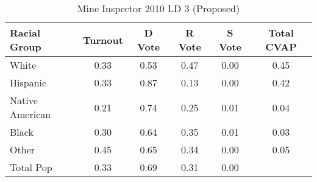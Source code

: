 \begin{table}[htb]
\begin{center}
\caption{Mine Inspector 2010 LD 3 (Proposed)}
\label{smine_cvap_ld_3}
\begin{tabular}{lccccc}
  \hline
Racial Group & Turnout & D Vote & R Vote & S Vote & Total CVAP \\ 
  \hline
White & 0.33 & 0.53 & 0.47 & 0.00 & 0.45 \\ 
  Hispanic & 0.33 & 0.87 & 0.13 & 0.00 & 0.42 \\ 
  Native American & 0.21 & 0.74 & 0.25 & 0.01 & 0.04 \\ 
  Black & 0.30 & 0.64 & 0.35 & 0.01 & 0.03 \\ 
  Other & 0.45 & 0.65 & 0.34 & 0.00 & 0.05 \\ 
  Total Pop & 0.33 & 0.69 & 0.31 & 0.00 &  \\ 
   \hline
\end{tabular}
\end{center}
\end{table}
